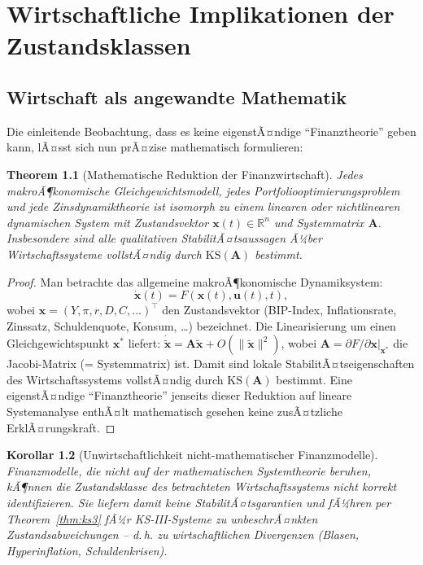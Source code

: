 ﻿\documentclass[12pt, a4paper, titlepage]{report}
\newtheorem{theorem}{Theorem}[section]
\newtheorem{corollary}[theorem]{Korollar}
\theoremstyle{definition}
\theoremstyle{remark}
\newcommand{\R}{\mathbb{R}}
\newcommand{\vx}{\bm{x}}
\newcommand{\vu}{\bm{u}}
\newcommand{\vA}{\bm{A}}
\newcommand{\T}{\top}
\newcommand{\KS}{\mathrm{KS}}
\begin{document}
\chapter{Wirtschaftliche Implikationen der Zustandsklassen}
\label{sec:wirtschaft}

\section{Wirtschaft als angewandte Mathematik}

Die einleitende Beobachtung, dass es keine eigenstÃ¤ndige ``Finanztheorie'' geben kann,
lÃ¤sst sich nun prÃ¤zise mathematisch formulieren:

\begin{theorem}[Mathematische Reduktion der Finanzwirtschaft]
\label{thm:finanzreduktion}
Jedes makroÃ¶konomische Gleichgewichtsmodell, jedes Portfoliooptimierungs\-problem
und jede Zinsdynamiktheorie ist isomorph zu einem linearen oder nichtlinearen
dynamischen System mit Zustandsvektor $\vx(t) \in \R^n$ und Systemmatrix $\vA$.
Insbesondere sind alle qualitativen StabilitÃ¤tsaussagen Ã¼ber Wirtschaftssysteme
vollstÃ¤ndig durch $\KS(\vA)$ bestimmt.
\end{theorem}

\begin{proof}
Man betrachte das allgemeine makroÃ¶konomische Dynamiksystem:
\begin{equation}
  \dot{\vx}(t) = F(\vx(t), \vu(t), t),
  \label{eq:makrodynamik}
\end{equation}
wobei $\vx = (Y, \pi, r, D, C, \ldots)^\T$ den Zustandsvektor (BIP-Index,
Inflationsrate, Zinssatz, Schuldenquote, Konsum, \ldots) bezeichnet. Die
Linearisierung um einen Gleichgewichtspunkt $\vx^*$ liefert:
$\dot{\tilde{\vx}} = \vA\tilde{\vx} + O(\|\tilde{\vx}\|^2)$, wobei
$\vA = \partial F / \partial \vx\big|_{\vx^*}$ die Jacobi-Matrix (= Systemmatrix)
ist. Damit sind lokale StabilitÃ¤tseigenschaften des Wirtschaftssystems vollstÃ¤ndig
durch $\KS(\vA)$ bestimmt. Eine eigenstÃ¤ndige ``Finanztheorie'' jenseits dieser
Reduktion auf lineare Systemanalyse enthÃ¤lt mathematisch gesehen keine zusÃ¤tzliche
ErklÃ¤rungskraft. \qedhere
\end{proof}

\begin{corollary}[Unwirtschaftlichkeit nicht-mathematischer Finanzmodelle]
\label{cor:unwirtschaft}
Finanzmodelle, die nicht auf der mathematischen Systemtheorie beruhen, kÃ¶nnen die
Zustandsklasse des betrachteten Wirtschaftssystems nicht korrekt identifizieren.
Sie liefern damit keine StabilitÃ¤tsgarantien und fÃ¼hren per Theorem~\ref{thm:ks3}
fÃ¼r KS-III-Systeme zu unbeschrÃ¤nkten Zustandsabweichungen -- d.\,h. zu
wirtschaftlichen Divergenzen (Blasen, Hyperinflation, Schuldenkrisen).
\end{corollary}
\end{document}
